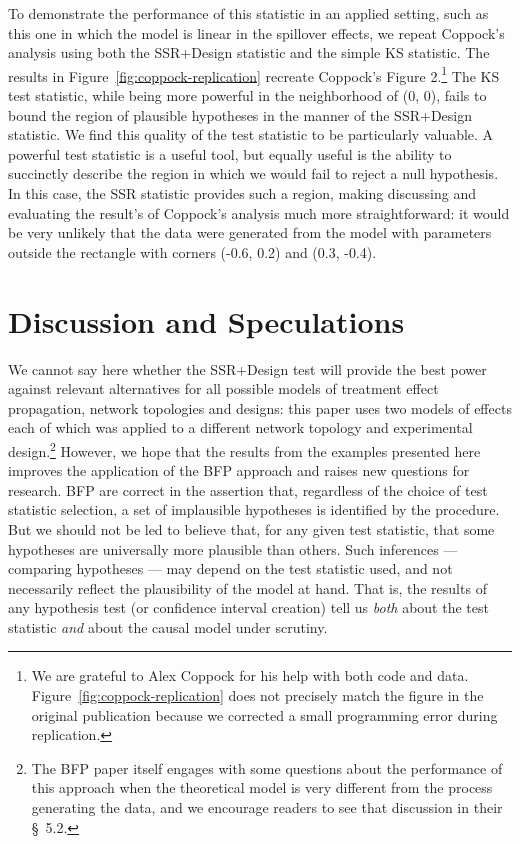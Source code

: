 To demonstrate the performance of this statistic in
an applied setting, such as this one in which  the model is linear in the spillover effects, we repeat
Coppock's analysis using both the SSR+Design statistic and the simple KS statistic. The
results in Figure~\ref{fig:coppock-replication} recreate Coppock's Figure
2.\footnote{We are grateful to Alex Coppock for his help with both code and
  data. Figure~\ref{fig:coppock-replication} does not precisely match the
  figure in the original publication because we corrected a small
  programming error during replication.}
 The KS test statistic, while being more powerful in the neighborhood of (0,
0), fails to bound the region of plausible hypotheses in the manner of the
SSR+Design statistic. We find this quality of the test statistic to be
particularly valuable. A powerful test statistic is a useful
tool, but equally useful is the ability to succinctly describe the region in
which we would fail to reject a null hypothesis. In this case, the SSR statistic
provides such a region, making discussing and evaluating the result's
of Coppock's analysis much more straightforward: it would be very unlikely that
the data were generated from the model with parameters outside the rectangle
with corners (-0.6, 0.2) and (0.3, -0.4).

\section{Discussion and Speculations}

We cannot say here whether the SSR+Design test will provide the best power
against relevant alternatives for all possible models of treatment effect
propagation, network topologies and designs: this paper uses two models of
effects each of which was applied to a different network topology and
experimental design.\footnote{The BFP paper itself engages with some questions about
the performance of this approach when the theoretical model is very different
from the process generating the data, and we encourage readers to see that
discussion in their \S~5.2.} However, we hope that the results from the 
examples presented here improves the application of the BFP approach and raises new
questions for research.  BFP are correct in the assertion that, regardless of
the choice of test statistic selection, a set of implausible hypotheses is
identified by the procedure. But we should not be led to believe that, for any
given test statistic, that some hypotheses are universally more plausible than others.
Such inferences --- comparing hypotheses --- may depend on the test statistic
used, and not necessarily reflect the plausibility of the model at hand. That
is, the results of any hypothesis test (or confidence interval creation) tell
us \emph{both} about the test statistic \emph{and} about the causal model under scrutiny.


